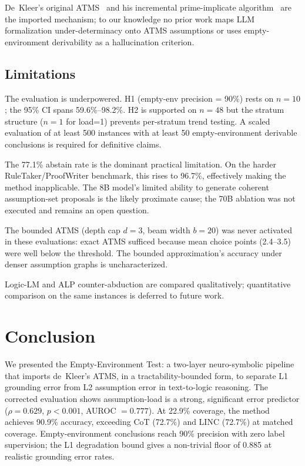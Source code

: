 \documentclass[11pt,letterpaper]{article}
\begin{document}
De~Kleer's original ATMS~\citep{deKleer1986} and his incremental prime-implicate
algorithm~\citep{deKleer1992} are the imported mechanism; to our knowledge no prior work maps LLM
formalization under-determinacy onto ATMS assumptions or uses empty-environment derivability as a
hallucination criterion.

\subsection{Limitations}

The evaluation is underpowered. H1 (empty-env precision = 90\%) rests on $n=10$; the 95\% CI spans
59.6\%--98.2\%. H2 is supported on $n=48$ but the stratum structure ($n=1$ for load=1) prevents
per-stratum trend testing. A scaled evaluation of at least 500 instances with at least 50
empty-environment derivable conclusions is required for definitive claims.

The 77.1\% abstain rate is the dominant practical limitation. On the harder RuleTaker/ProofWriter
benchmark, this rises to 96.7\%, effectively making the method inapplicable. The 8B model's limited
ability to generate coherent assumption-set proposals is the likely proximate cause; the 70B ablation
was not executed and remains an open question.

The bounded ATMS (depth cap $d=3$, beam width $b=20$) was never activated in these evaluations: exact
ATMS sufficed because mean choice points (2.4--3.5) were well below the threshold. The bounded
approximation's accuracy under denser assumption graphs is uncharacterized.

Logic-LM and ALP counter-abduction are compared qualitatively; quantitative comparison on the same
instances is deferred to future work.

\section{Conclusion}

We presented the Empty-Environment Test: a two-layer neuro-symbolic pipeline that imports de~Kleer's
ATMS, in a tractability-bounded form, to separate L1 grounding error from L2 assumption error in
text-to-logic reasoning. The corrected evaluation shows assumption-load is a strong, significant error
predictor ($\rho=0.629$, $p<0.001$, AUROC $=0.777$). At 22.9\% coverage, the method achieves 90.9\%
accuracy, exceeding CoT (72.7\%) and LINC (72.7\%) at matched coverage. Empty-environment conclusions
reach 90\% precision with zero label supervision; the L1 degradation bound gives a non-trivial floor
of 0.885 at realistic grounding error rates.
\end{document}
